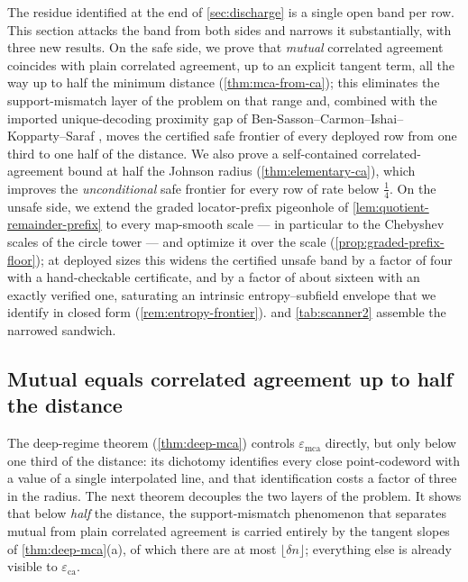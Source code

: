 \documentclass[11pt]{article}
\theoremstyle{definition}
\theoremstyle{remark}
\newcommand{\eca}{\varepsilon_{\mathrm{ca}}}
\newcommand{\emca}{\varepsilon_{\mathrm{mca}}}
\begin{document}
The residue identified at the end of \cref{sec:discharge} is a single open band per row. This section attacks the band from both sides and narrows it substantially, with three new results. On the safe side, we prove that \emph{mutual} correlated agreement coincides with plain correlated agreement, up to an explicit tangent term, all the way up to half the minimum distance (\cref{thm:mca-from-ca}); this eliminates the support-mismatch layer of the problem on that range and, combined with the imported unique-decoding proximity gap of Ben-Sasson--Carmon--Ishai--Kopparty--Saraf \cite{BCIKS20}, moves the certified safe frontier of every deployed row from one third to one half of the distance. We also prove a self-contained correlated-agreement bound at half the Johnson radius (\cref{thm:elementary-ca}), which improves the \emph{unconditional} safe frontier for every row of rate below $\tfrac14$. On the unsafe side, we extend the graded locator-prefix pigeonhole of \cref{lem:quotient-remainder-prefix} to every map-smooth scale --- in particular to the Chebyshev scales of the circle tower --- and optimize it over the scale (\cref{prop:graded-prefix-floor}); at deployed sizes this widens the certified unsafe band by a factor of four with a hand-checkable certificate, and by a factor of about sixteen with an exactly verified one, saturating an intrinsic entropy--subfield envelope that we identify in closed form (\cref{rem:entropy-frontier}).  and \cref{tab:scanner2} assemble the narrowed sandwich.

\subsection{Mutual equals correlated agreement up to half the distance}\label{sec:pincer-half}

The deep-regime theorem (\cref{thm:deep-mca}) controls $\emca$ directly, but only below one third of the distance: its dichotomy identifies every close point-codeword with a value of a single interpolated line, and that identification costs a factor of three in the radius. The next theorem decouples the two layers of the problem. It shows that below \emph{half} the distance, the support-mismatch phenomenon that separates mutual from plain correlated agreement is carried entirely by the tangent slopes of \cref{thm:deep-mca}\textup{(a)}, of which there are at most $\lfloor\delta n\rfloor$; everything else is already visible to $\eca$.
\end{document}
